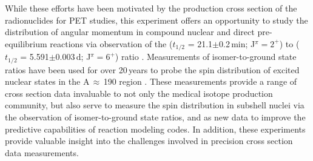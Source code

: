 


While these efforts have been motivated by the production cross section of the  radionuclides for PET studies, this experiment offers an opportunity to study the distribution of angular momentum in compound nuclear and direct pre-equilibrium reactions via observation of the  ($t_{1/2}$ = 21.1$\pm$0.2\,min; J$^\pi=2^+$) to  ($t_{1/2}$ = 5.591$\pm$0.003\,d; J$^\pi=6^+$)   ratio \cite{Dong2015,Wang2017}.
Measurements of isomer-to-ground state ratios have been used for over 20\,years to probe the spin distribution of excited nuclear states in the A\,$\approx$\,190 region \cite{PhysRevC.73.034613,PhysRevC.45.1171}.
These measurements provide a range of cross section data invaluable to not only the medical isotope production community, but  also serve to measure the spin distribution in  subshell nuclei via the observation of isomer-to-ground state ratios, and  as new data to improve the predictive capabilities of  reaction modeling codes. 
In addition, these experiments provide valuable insight into the challenges  involved in precision cross section data measurements. 










